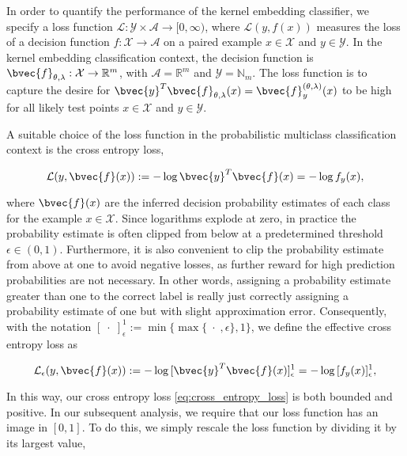 \documentclass{article}
\begin{document}
		In order to quantify the performance of the kernel embedding classifier, we specify a loss function $\mathcal{L} : \mathcal{Y} \times \mathcal{A} \to [0, \infty)$, where $\mathcal{L}(y, f(x))$ measures the loss of a decision function $f : \mathcal{X} \to \mathcal{A}$ on a paired example $x \in \mathcal{X}$ and $y \in \mathcal{Y}$. In the kernel embedding classification context, the decision function is $\bvec{f}_{\theta, \lambda} : \mathcal{X} \to \mathbb{R}^{m}$, with $\mathcal{A} = \mathbb{R}^{m}$ and $\mathcal{Y} = \mathbb{N}_{m}$. The loss function is to capture the desire for $\bvec{y}^{T} \bvec{f}_{\theta, \lambda}(x) = \bvec{f}_{y}^{(\theta, \lambda)}(x)$ to be high for all likely test points $x \in \mathcal{X}$ and $y \in \mathcal{Y}$.
		
		A suitable choice of the loss function in the probabilistic multiclass classification context is the cross entropy loss,
		
		\begin{equation}
			\mathcal{L}(y, \bvec{f}(x)) := - \log{\bvec{y}^{T} \bvec{f}(x)} = - \log{f_{y}(x)},
		\end{equation}
		
		where $\bvec{f}(x)$ are the inferred decision probability estimates of each class for the example $x \in \mathcal{X}$. Since logarithms explode at zero, in practice the probability estimate is often clipped from below at a predetermined threshold $\epsilon \in (0, 1)$. Furthermore, it is also convenient to clip the probability estimate from above at one to avoid negative losses, as further reward for high prediction probabilities are not necessary. In other words, assigning a probability estimate greater than one to the correct label is really just correctly assigning a probability estimate of one but with slight approximation error. Consequently, with the notation $[\;\cdot\;]_{\epsilon}^{1} := \min\{\max\{\;\cdot\;, \epsilon\}, 1\}$, we define the effective cross entropy loss as
		
		\begin{equation}
			\mathcal{L}_{\epsilon}(y, \bvec{f}(x)) := - \log{ [\bvec{y}^{T} \bvec{f}(x)]_{\epsilon}^{1} } = - \log{ [f_{y}(x)]_{\epsilon}^{1} },
		\label{eq:cross_entropy_loss}
		\end{equation}
		
		In this way, our cross entropy loss \eqref{eq:cross_entropy_loss} is both bounded and positive. In our subsequent analysis, we require that our loss function has an image in $[0, 1]$. To do this, we simply rescale the loss function by dividing it by its largest value,
		
\end{document}

